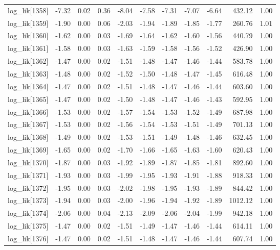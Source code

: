 \begin{table}[ht]
\begin{tabular}{rrrrrrrrrrr}
  log\_lik[1358] & -7.32 & 0.02 & 0.36 & -8.04 & -7.58 & -7.31 & -7.07 & -6.64 & 432.12 & 1.00 \\ 
  log\_lik[1359] & -1.90 & 0.00 & 0.06 & -2.03 & -1.94 & -1.89 & -1.85 & -1.77 & 260.76 & 1.01 \\ 
  log\_lik[1360] & -1.62 & 0.00 & 0.03 & -1.69 & -1.64 & -1.62 & -1.60 & -1.56 & 440.79 & 1.00 \\ 
  log\_lik[1361] & -1.58 & 0.00 & 0.03 & -1.63 & -1.59 & -1.58 & -1.56 & -1.52 & 426.90 & 1.00 \\ 
  log\_lik[1362] & -1.47 & 0.00 & 0.02 & -1.51 & -1.48 & -1.47 & -1.46 & -1.44 & 583.78 & 1.00 \\ 
  log\_lik[1363] & -1.48 & 0.00 & 0.02 & -1.52 & -1.50 & -1.48 & -1.47 & -1.45 & 616.48 & 1.00 \\ 
  log\_lik[1364] & -1.47 & 0.00 & 0.02 & -1.51 & -1.48 & -1.47 & -1.46 & -1.44 & 603.60 & 1.00 \\ 
  log\_lik[1365] & -1.47 & 0.00 & 0.02 & -1.50 & -1.48 & -1.47 & -1.46 & -1.43 & 592.95 & 1.00 \\ 
  log\_lik[1366] & -1.53 & 0.00 & 0.02 & -1.57 & -1.54 & -1.53 & -1.52 & -1.49 & 687.98 & 1.00 \\ 
  log\_lik[1367] & -1.53 & 0.00 & 0.02 & -1.56 & -1.54 & -1.53 & -1.51 & -1.49 & 701.13 & 1.00 \\ 
  log\_lik[1368] & -1.49 & 0.00 & 0.02 & -1.53 & -1.51 & -1.49 & -1.48 & -1.46 & 632.45 & 1.00 \\ 
  log\_lik[1369] & -1.65 & 0.00 & 0.02 & -1.70 & -1.66 & -1.65 & -1.63 & -1.60 & 620.43 & 1.00 \\ 
  log\_lik[1370] & -1.87 & 0.00 & 0.03 & -1.92 & -1.89 & -1.87 & -1.85 & -1.81 & 892.60 & 1.00 \\ 
  log\_lik[1371] & -1.93 & 0.00 & 0.03 & -1.99 & -1.95 & -1.93 & -1.91 & -1.88 & 918.33 & 1.00 \\ 
  log\_lik[1372] & -1.95 & 0.00 & 0.03 & -2.02 & -1.98 & -1.95 & -1.93 & -1.89 & 844.42 & 1.00 \\ 
  log\_lik[1373] & -1.94 & 0.00 & 0.03 & -2.00 & -1.96 & -1.94 & -1.92 & -1.89 & 1012.12 & 1.00 \\ 
  log\_lik[1374] & -2.06 & 0.00 & 0.04 & -2.13 & -2.09 & -2.06 & -2.04 & -1.99 & 942.18 & 1.00 \\ 
  log\_lik[1375] & -1.47 & 0.00 & 0.02 & -1.51 & -1.49 & -1.47 & -1.46 & -1.44 & 614.11 & 1.00 \\ 
  log\_lik[1376] & -1.47 & 0.00 & 0.02 & -1.51 & -1.48 & -1.47 & -1.46 & -1.44 & 607.74 & 1.00 \\ 

\end{tabular}
\end{table}
